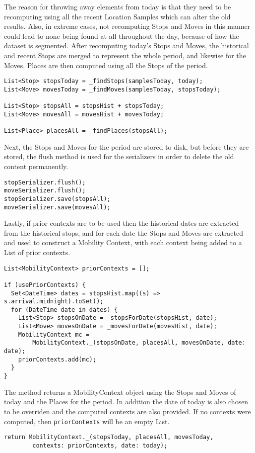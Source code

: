 The reason for throwing away elements from today is that they need to be recomputing using all the recent Location Samples which can alter the old results. Also, in extreme cases, not recomputing Stops and Moves in this manner could lead to none being found at all throughout the day, because of how the dataset is segmented. After recomputing today's Stops and Moves, the historical and recent Stops are merged to represent the whole period, and likewise for the Moves. Places are then computed using all the Stops of the period.
\begin{verbatim}
List<Stop> stopsToday = _findStops(samplesToday, today);
List<Move> movesToday = _findMoves(samplesToday, stopsToday);

List<Stop> stopsAll = stopsHist + stopsToday;
List<Move> movesAll = movesHist + movesToday;

List<Place> placesAll = _findPlaces(stopsAll);
\end{verbatim}

Next, the Stops and Moves for the period are stored to disk, but before they are stored, the flush method is used for the serializers in order to delete the old content permanently.
\begin{verbatim}
stopSerializer.flush();
moveSerializer.flush();
stopSerializer.save(stopsAll);
moveSerializer.save(movesAll);
\end{verbatim}

Lastly, if prior contexts are to be used then the historical dates are extracted from the historical stops, and for each date the Stops and Moves are extracted and used to construct a Mobility Context, with each context being added to a List of prior contexts.

\begin{verbatim}
List<MobilityContext> priorContexts = [];

if (usePriorContexts) {
  Set<DateTime> dates = stopsHist.map((s) => s.arrival.midnight).toSet();
  for (DateTime date in dates) {
    List<Stop> stopsOnDate = _stopsForDate(stopsHist, date);
    List<Move> movesOnDate = _movesForDate(movesHist, date);
    MobilityContext mc =
        MobilityContext._(stopsOnDate, placesAll, movesOnDate, date: date);
    priorContexts.add(mc);
  }
}
\end{verbatim}

The method returns a MobilityContext object using the Stops and Moves of today and the Places for the period. In addition the date of today is also chosen to be overriden and the computed contexts are also provided. If no contexts were computed, then \verb|priorContexts| will be an empty List.

\begin{verbatim}
return MobilityContext._(stopsToday, placesAll, movesToday,
        contexts: priorContexts, date: today);
\end{verbatim}

